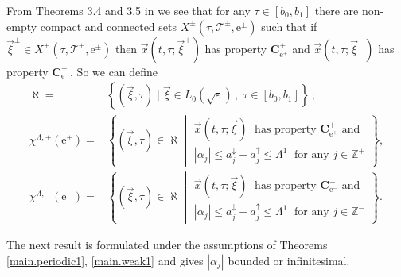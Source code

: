 \documentclass[10pt]{article}
\numberwithin{equation}{section}
\def\ep{\varepsilon}
\def\Z{{\mathbb Z}}
\def\ee{{\mathrm e}}
\def\TT{{\mathcal T}}
\def\aup{a^{\uparrow}}
\def\adown{a^{\downarrow}}
\def\l1{\Lambda^{1}}
\def\xxi{\vec{\xi}}
\def\x{\vec{x}}
\newcommand\bs[1]{{\boldsymbol{#1}}}
\theoremstyle{definition}
\theoremstyle{remark}
\begin{document}
From Theorems 3.4 and 3.5 in \cite{CFPrestate}
 we see that for any $\tau \in [b_0, b_1]$ there are non-empty compact and connected sets
$X^{\pm}(\tau,\TT^{\pm},\ee^{\pm})$ such that if $\xxi^{\pm} \in X^{\pm}(\tau,\TT^{\pm},\ee^{\pm})$ then
$\x(t,\tau; \xxi^+)$ has property $\bs{C_{\ee^+}^+}$ and $\x(t,\tau; \xxi^-)$ has property $\bs{C_{\ee^-}^-}$.
So we can define
\begin{equation}\label{defX+la}
 \begin{split}
    \aleph= & \left\{ (\xxi,\tau) \mid  \xxi \in L_0(\sqrt{\ep})
     \, , \;\tau \in  [b_0, b_1]  \right\} \,; \\
 \chi^{\Lambda,+}(\ee^+)=     &   \left\{ (\xxi,\tau) \in \aleph \middle|  \begin{array}{l}
                                      \x(t,\tau ; \xxi) \; \textrm{ has property $\bs{C^+_{\ee^+}}$ and } \\
                                      |\alpha_j| \le  \adown_j-\aup_j \le \l1  \; \textrm{ for any $j \in \Z^+$}
                                    \end{array}  \right\},\\
\chi^{\Lambda,-}(\ee^-)= & \left\{ (\xxi,\tau) \in\aleph \middle|  \begin{array}{l}
                                      \x(t,\tau ; \xxi) \; \textrm{ has property $\bs{C^-_{\ee^-}}$ and } \\
                                     |\alpha_j| \le \adown_j-\aup_j \le  \l1  \; \textrm{ for any $j \in \Z^-$}
                                    \end{array}  \right\} .
 \end{split}
\end{equation}


The next result is formulated under the assumptions of Theorems
\ref{main.periodic1},
\ref{main.weak1} and gives $|\alpha_j|$ bounded or infinitesimal.
\end{document}
